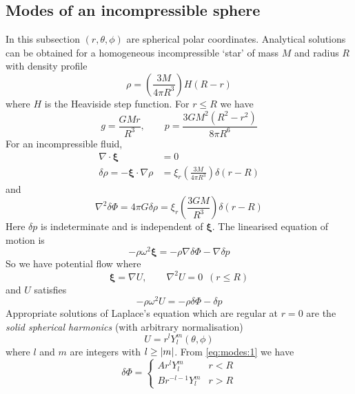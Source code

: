 \documentclass{jknotes}
\newcommand{\disp}{\symbf{\xi}}
\begin{document}
\subsection{Modes of an incompressible sphere}
In this subsection $(r, \theta, \phi)$ are spherical polar coordinates.
Analytical solutions can be obtained for a homogeneous incompressible `star'
of mass $M$ and radius $R$ with density profile
\begin{equation}
	\rho = \left( \frac{3M}{4\pi R^3}\right) H(R-r)
\end{equation}
where $H$ is the Heaviside step function. For $r \le R$ we have
\begin{equation}
	g = \frac{GMr}{R^3}, \hspace{2em} p = \frac{3GM^2(R^2-r^2)}{8\pi R^6}
\end{equation}
For an incompressible fluid,
\begin{align}
	\nabla \cdot \disp &= 0 \\
	\delta \rho = -\disp \cdot \nabla \rho &= \xi_r \left( \frac{3M}{4\pi
	R^3}\right) \delta(r-R)
\end{align}
and
\begin{equation}
	\nabla^2 \delta \Phi = 4\pi G \delta \rho = \xi_r \left(
	\frac{3GM}{R^3}\right)\delta(r-R) \label{eq:modes:1}
\end{equation}
Here $\delta p$ is indeterminate and is independent of $\disp$. The linearised
equation of motion is
\begin{equation}
	-\rho \omega^2 \disp = -\rho \nabla \delta \Phi - \nabla \delta p
\end{equation}
So we have potential flow where
\begin{equation}
	\disp = \nabla U, \hspace{2em} \nabla^2 U = 0 \,\,\, (r \le R)
\end{equation}
and $U$ satisfies
\begin{equation}
	-\rho \omega^2 U = - \rho \delta \Phi - \delta p
\end{equation}
Appropriate solutions of Laplace's equation which are regular at $r=0$ are the
\emph{solid spherical harmonics} (with arbitrary normalisation)
\begin{equation}
	U = r^l Y_l^m(\theta,\phi)
\end{equation}
where $l$ and $m$ are integers with $l \ge \abs{m}$. From \eqref{eq:modes:1}
we have
\begin{equation}
	\delta \Phi = \begin{cases}
		Ar^lY_l^m & r < R \\
		Br^{-l-1}Y_l^m & r > R
	\end{cases}
\end{equation}
\end{document}
